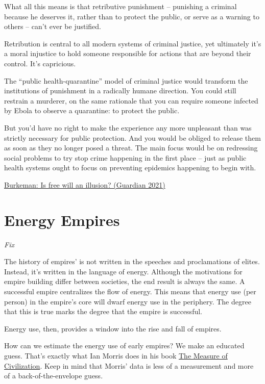 \documentclass[
]{book}
\begin{document}
What all this means is that retributive punishment -- punishing a criminal because he deserves it, rather than to protect the public, or serve as a warning to others -- can't ever be justified.

Retribution is central to all modern systems of criminal justice, yet ultimately it's a moral injustice to hold someone responsible for actions that are beyond their control. It's capricious.

The ``public health-quarantine'' model of criminal justice would transform the institutions of punishment in a radically humane direction.
You could still restrain a murderer, on the same rationale that you can require someone infected by Ebola to observe a quarantine: to protect the public.

But you'd have no right to make the experience any more unpleasant than was strictly necessary for public protection. And you would be obliged to release them as soon as they no longer posed a threat. The main focus would be on redressing social problems to try stop crime happening in the first place -- just as public health systems ought to focus on preventing epidemics happening to begin with.

\href{https://www.theguardian.com/news/2021/apr/27/the-clockwork-universe-is-free-will-an-illusion}{Burkeman: Is free will an illusion? (Guardian 2021)}

\hypertarget{energy-empires}{%
\chapter{Energy Empires}\label{energy-empires}}

\emph{Fix}

The history of empires' is not written in the speeches and proclamations of elites.
Instead, it's written in the language of energy.
Although the motivations for empire building differ between societies,
the end result is always the same.
A successful empire centralizes the flow of energy.
This means that energy use (per person) in the empire's core
will dwarf energy use in the periphery.
The degree that this is true marks the degree that the empire is successful.

Energy use, then, provides a window into the rise and fall of empires.

How can we estimate the energy use of early empires? We make an educated guess.
That's exactly what
Ian Morris does in his book
\href{https://www.goodreads.com/book/show/18730662-the-measure-of-civilization}{The Measure of Civilization}.
Keep in mind that Morris' data is less of a measurement and more of a back-of-the-envelope guess.
\end{document}
